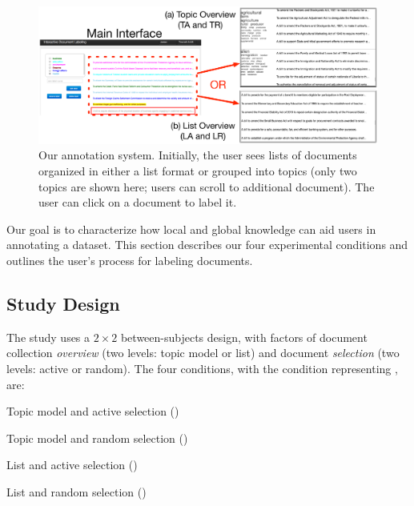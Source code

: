 
\begin{figure}[t!]

  \begin{center}
  \includegraphics[width=\textwidth]{2016_acl_doclabel/figures/ui_docview}
  \end{center}

	\caption{Our annotation system.  Initially, the user sees lists of
          documents organized in either a list format or grouped into
          topics (only two topics are shown here; users can scroll to
          additional document).  The user can click on a document to
          label it.}
\label{fig:UI-overview}
\end{figure}



Our goal is to characterize how local and global knowledge can aid
users in annotating a dataset.  This section describes our four
experimental conditions and outlines the user's process for labeling documents.

\subsection{Study Design}
\label{sub:exp_conditions}





The study uses a $2\times2$ between-subjects design, with factors of
document collection \emph{overview} (two levels: topic model or list)
and document \emph{selection} (two levels: active or random). The four
conditions, with the 
condition representing \name{}, are:
\begin{enumerate*}
  \item Topic model and active selection ()
  \item Topic model and random selection ()
  \item List and active selection ()
  \item List and random selection ()
\end{enumerate*}

